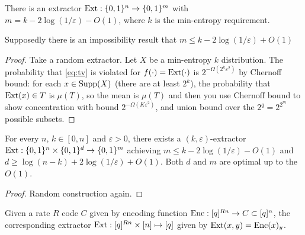 \begin{proposition}
  There is an extractor $\textnormal{Ext}:\{0,1\}^n\to\{0,1\}^m$ with $m=k-2\log(1/\varepsilon)-O(1)$, where $k$ is the min-entropy requirement.

  Supposedly there is an impossibility result that  $m\le k-2\log(1/\varepsilon)+O(1)$
\end{proposition}
\begin{proof}
  Take a random extractor. Let $X$ be a min-entropy $k$ distribution. 
  The probability that \eqref{eq:tv} is violated for $f(\cdot)=\textnormal{Ext}(\cdot)$ is $2^{-\Omega(2^k\varepsilon^2)}$ by Chernoff bound: for each $x\in\operatorname*{Supp}(X)$ (there are at least $2^k$), the probability that $\textnormal{Ext}(x)\in T$ is $\mu(T)$, so the mean is $\mu(T)$ and then you use Chernoff bound to show concentration with bound $2^{-\Omega(K\varepsilon^2)}$, and union bound over the $2^q=2^{2^m}$ possible subsets.
\end{proof}
\begin{theorem}
  For every $n$, $k\in[0,n]$ and $\varepsilon > 0$, there exists a $(k,\varepsilon)$-extractor $\textnormal{Ext} : \{0,1\}^n \times  \{0,1\}^d \to \{0,1\}^m$ achieving $m \le k - 2\log(1/\varepsilon) - O(1)$ and $d \ge \log(n - k) + 2\log(1/\varepsilon) + O(1)$. 
  Both $d$ and $m$ are optimal up to the $O(1)$.
\end{theorem}
\begin{proof}
  Random construction again.
\end{proof}


\begin{definition}
  Given a rate $R$ code $C$ given by encoding function $\operatorname*{Enc}:[q]^{Rn}\to C\subset[q]^n$, the corresponding extractor $\textnormal{Ext}:[q]^{Rn}\times [n]\mapsto [q]$ given by $\textnormal{Ext}(x,y) = \operatorname*{Enc}(x)_y$.
\end{definition}

